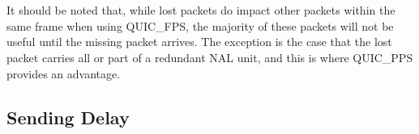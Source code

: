 \documentclass{mpaper}
\begin{document}
\\\\
It should be noted that, while lost packets do impact other packets within the same frame when using QUIC\_FPS, the majority of these packets will not be useful until the missing packet arrives. The exception is the case that the lost packet carries all or part of a redundant NAL unit, and this is where QUIC\_PPS provides an advantage.








\subsection{Sending Delay}
\end{document}

